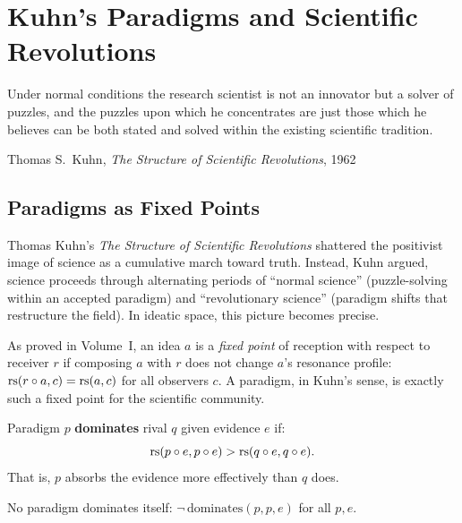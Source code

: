 
\chapter{Kuhn's Paradigms and Scientific Revolutions}
\label{ch:kuhn}

\epigraph{Under normal conditions the research scientist is not an innovator but a solver of puzzles, and the puzzles upon which he concentrates are just those which he believes can be both stated and solved within the existing scientific tradition.}{Thomas S.\ Kuhn, \textit{The Structure of Scientific Revolutions}, 1962}

\section{Paradigms as Fixed Points}

Thomas Kuhn's \textit{The Structure of Scientific Revolutions} shattered the
positivist image of science as a cumulative march toward truth. Instead, Kuhn
argued, science proceeds through alternating periods of ``normal science''
(puzzle-solving within an accepted paradigm) and ``revolutionary science''
(paradigm shifts that restructure the field). In ideatic space, this picture
becomes precise.

As proved in Volume~I, an idea $a$ is a \emph{fixed point} of reception with
respect to receiver $r$ if composing $a$ with $r$ does not change $a$'s
resonance profile: $\mathrm{rs}(r \circ a, c) = \mathrm{rs}(a, c)$ for all observers $c$.
A paradigm, in Kuhn's sense, is exactly such a fixed point for the scientific
community.

\begin{definition}
\label{def:paradigm-dominates}
Paradigm $p$ \textbf{dominates} rival $q$ given evidence $e$ if:
\[
  \mathrm{rs}(p \circ e, p \circ e) > \mathrm{rs}(q \circ e, q \circ e).
\]
That is, $p$ absorbs the evidence more effectively than $q$ does.
\end{definition}

\begin{theorem}
\label{thm:paradigm-irrefl}
No paradigm dominates itself: $\neg\,\mathrm{dominates}(p, p, e)$ for all $p, e$.
\end{theorem}

